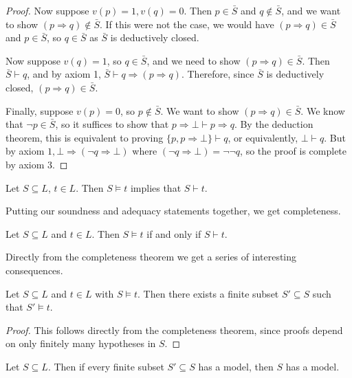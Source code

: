 \documentclass[a3paper, 10pt]{article}
\begin{document}
\begin{multicols*}{5}
\begin{proof}
  Now suppose $v(p)=1, v(q)=0$. Then $p \in \bar{S}$ and $q \notin \bar{S}$, and we want to show $(p \Rightarrow q) \notin \bar{S}$. If this were not the case, we would have $(p \Rightarrow q) \in \bar{S}$ and $p \in \bar{S}$, so $q \in \bar{S}$ as $\bar{S}$ is deductively closed.

  Now suppose $v(q)=1$, so $q \in \bar{S}$, and we need to show $(p \Rightarrow q) \in \bar{S}$. Then $\bar{S} \vdash q$, and by axiom 1, $\bar{S} \vdash q \Rightarrow(p \Rightarrow q)$. Therefore, since $\bar{S}$ is deductively closed, $(p \Rightarrow q) \in \bar{S}$.

  Finally, suppose $v(p)=0$, so $p \notin \bar{S}$. We want to show $(p \Rightarrow q) \in \bar{S}$. We know that $\neg p \in \bar{S}$, so it suffices to show that $p \Rightarrow \bot \vdash p \Rightarrow q$. By the deduction theorem, this is equivalent to proving $\{p, p \Rightarrow \bot\} \vdash q$, or equivalently, $\bot \vdash q$. But by axiom $1, \bot \Rightarrow(\neg q \Rightarrow \bot)$ where $(\neg q \Rightarrow \bot)=\neg \neg q$, so the proof is complete by axiom 3.
\end{proof}

\begin{corollary}[Adequacy]
  Let $S \subseteq L$, $t \in L$. Then $S \models t$ implies that $S \vdash t$. 
\end{corollary}

Putting our soundness and adequacy statements together, we get completeness.

\begin{theorem}
  Let $S \subseteq L$ and $t \in L$. Then $S \models t$ if and only if $S \vdash t$.
\end{theorem}

Directly from the completeness theorem we get a series of interesting consequences.

\begin{theorem}
  Let $S \subseteq L$ and $t \in L$ with $S \models t$. Then there exists a finite subset $S' \subseteq S$ such that $S' \models t$.
\end{theorem}
\begin{proof}
  This follows directly from the completeness theorem, since proofs depend on only finitely many hypotheses in $S$.
\end{proof}

\begin{corollary}
  Let $S \subseteq L$. Then if every finite subset $S' \subseteq S$ has a model, then $S$ has a model. 
\end{corollary}


\end{multicols*}
\end{document}
